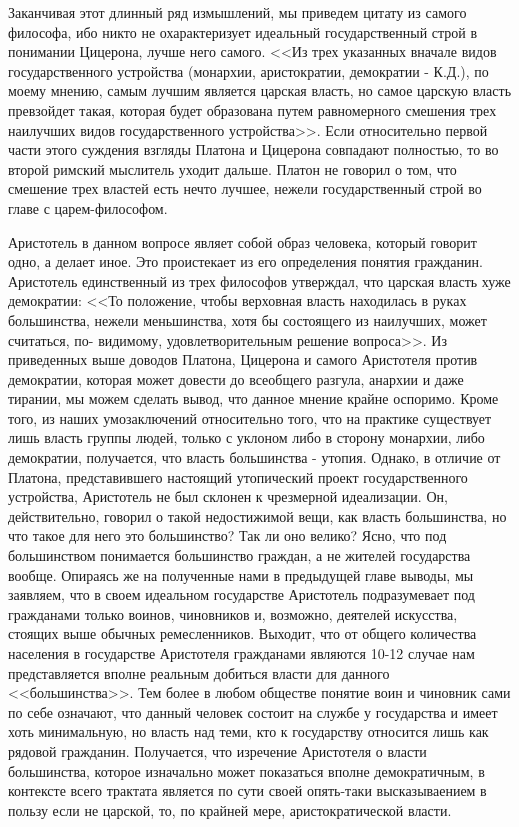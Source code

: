 	Заканчивая этот длинный ряд измышлений, мы приведем цитату из самого 
	философа, ибо никто не охарактеризует идеальный государственный строй в 
	понимании Цицерона, лучше него самого. <<Из трех указанных вначале видов 
	государственного устройства (монархии, аристократии, демократии - К.Д.), 
	по моему мнению, самым лучшим является царская власть, но самое царскую 
	власть превзойдет такая, которая будет образована путем равномерного 
	смешения трех наилучших видов государственного устройства>>. Если 
	относительно первой части этого суждения взгляды Платона и Цицерона 
	совпадают полностью, то во второй римский мыслитель уходит дальше. 
	Платон не говорил о том, что смешение трех властей есть нечто лучшее, 
	нежели государственный строй во главе с царем-философом.

	Аристотель в данном вопросе являет собой образ человека, который говорит 
	одно, а делает иное. Это проистекает из его определения понятия гражданин. 
	Аристотель единственный из трех философов утверждал, что царская власть хуже
	демократии: <<То положение, чтобы верховная власть находилась в руках 
	большинства, нежели меньшинства, хотя бы состоящего из наилучших, может 
	считаться, по- видимому, удовлетворительным решение вопроса>>. Из приведенных 
	выше доводов Платона, Цицерона и самого Аристотеля против демократии, 
	которая может довести до всеобщего разгула, анархии и даже тирании, мы 
	можем сделать вывод, что данное мнение крайне оспоримо. Кроме того, из 
	наших умозаключений относительно того, что на практике существует лишь 
	власть группы людей, только с уклоном либо в сторону монархии, либо 
	демократии, получается, что власть большинства - утопия. Однако, в отличие 
	от Платона, представившего настоящий утопический проект государственного 
	устройства, Аристотель не был склонен к чрезмерной идеализации. Он, 
	действительно, говорил о такой недостижимой вещи, как власть большинства, 
	но что такое для него это большинство? Так ли оно велико? Ясно, что под 
	большинством понимается большинство граждан, а не жителей государства вообще. 
	Опираясь же на полученные нами в предыдущей главе выводы, мы заявляем, что 
	в своем идеальном государстве Аристотель подразумевает под гражданами 
	только воинов, чиновников и, возможно, деятелей искусства, стоящих выше 
	обычных ремесленников. Выходит, что от общего количества населения в 
	государстве Аристотеля гражданами являются 10-12%
	случае нам представляется вполне реальным добиться власти для данного 
	<<большинства>>. Тем более в любом обществе понятие воин и чиновник сами по 
	себе означают, что данный человек состоит на службе у государства и имеет 
	хоть минимальную, но власть над теми, кто к государству относится лишь как 
	рядовой гражданин. Получается, что изречение Аристотеля о власти большинства, 
	которое изначально может показаться вполне демократичным, в контексте всего 
	трактата является по сути своей опять-таки высказываением в пользу если не 
	царской, то, по крайней мере, аристократической власти.

